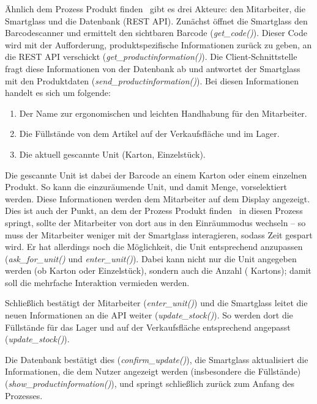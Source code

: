 Ähnlich dem Prozess \glqq Produkt finden\grqq~ gibt es drei Akteure: den Mitarbeiter, die Smartglass und die Datenbank (REST API). Zunächst öffnet die Smartglass den Barcodescanner und ermittelt den sichtbaren Barcode (\emph{get\_code()}). Dieser Code wird mit der Aufforderung, produktspezifische Informationen zurück zu geben,  an die REST API verschickt (\emph{get\_productinformation()}). Die Client-Schnittstelle fragt diese Informationen von der Datenbank ab und antwortet der Smartglass mit den Produktdaten (\emph{send\_productinformation()}). Bei diesen Informationen handelt es sich um folgende: 
\begin{enumerate}
	\item Der Name zur ergonomischen und leichten Handhabung für den Mitarbeiter.
	\item Die Füllstände von dem Artikel auf der Verkaufsfläche und im  Lager.
	\item Die aktuell gescannte Unit (Karton, Einzelstück).
\end{enumerate}
Die gescannte Unit ist dabei der Barcode an einem Karton oder einem einzelnen Produkt. So kann die einzuräumende Unit, und damit Menge, vorselektiert werden. Diese Informationen werden dem Mitarbeiter auf dem Display angezeigt. Dies ist auch der Punkt, an dem der Prozess \glqq Produkt finden\grqq~ in diesen Prozess springt, sollte der Mitarbeiter von dort aus in den Einräummodus wechseln -- so muss der Mitarbeiter weniger mit der Smartglass interagieren, sodass Zeit gespart wird. Er hat allerdings noch die Möglichkeit, die Unit entsprechend anzupassen (\emph{ask\_for\_unit()} und \emph{\emph{enter\_unit()}}). Dabei kann nicht nur die Unit angegeben werden (ob Karton oder Einzelstück), sondern auch die Anzahl ( Kartons); damit soll die mehrfache Interaktion vermieden werden. 

Schließlich bestätigt der Mitarbeiter (\emph{enter\_unit()}) und die Smartglass leitet die neuen Informationen an die API weiter (\emph{update\_stock()}). So werden dort die Füllstände für das Lager und auf der Verkaufsfläche entsprechend angepasst (\emph{update\_stock()}).

Die Datenbank bestätigt dies (\emph{confirm\_update()}), die Smartglass aktualisiert die Informationen, die dem Nutzer angezeigt werden (insbesondere die Füllstände) (\emph{show\_productinformation()}), und springt schließlich zurück zum Anfang des Prozesses. 


